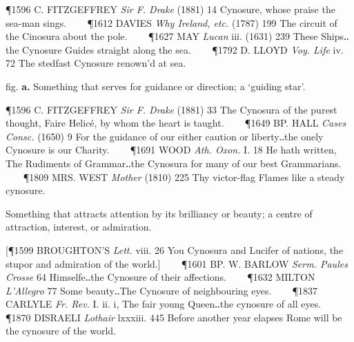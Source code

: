 \begin{description}[wide, labelwidth=!, labelindent=0pt]
\begin{myenumerate}
\P 1596 C. FITZGEFFREY  \textit{Sir F. Drake} (1881) 14 Cynosure, whose praise the sea-man sings.    
\P 1612 DAVIES  \textit{Why Ireland, etc.} (1787) 199 The circuit of the Cinosura about the pole.    
\P 1627 MAY  \textit{Lucan} iii. (1631) 239 These Ships‥the Cynosure Guides straight along the sea.    
\P 1792 D. LLOYD  \textit{Voy. Life} iv. 72 The stedfast Cynosure renown'd at sea.

 fig. \textbf{a.} Something that serves for guidance or direction; a ‘guiding star’.

\P 1596 C. FITZGEFFREY  \textit{Sir F. Drake} (1881) 33 The Cynosura of the purest thought, Faire Helicé, by whom the heart is taught.    
\P 1649 BP. HALL  \textit{Cases Consc.} (1650) 9 For the guidance of our either caution or liberty‥the onely Cynosure is our Charity.    
\P 1691 WOOD  \textit{Ath. Oxon.} I. 18 He hath written, The Rudiments of Grammar‥the Cynosura for many of our best Grammarians.    
\P 1809 MRS. WEST  \textit{Mother} (1810) 225 Thy victor-flag Flames like a steady cynosure.

 Something that attracts attention by its brilliancy or beauty; a centre of attraction, interest, or admiration.

[\P 1599 BROUGHTON'S  \textit{Lett.} viii. 26 You Cynosura and Lucifer of nations, the stupor and admiration of the world.]    
\P 1601 BP. W. BARLOW  \textit{Serm. Paules Crosse} 64 Himselfe‥the Cynosure of their affections.    
\P 1632 MILTON  \textit{L'Allegro} 77 Some beauty‥The Cynosure of neighbouring eyes.    
\P 1837 CARLYLE  \textit{Fr. Rev.} I. ii. i, The fair young Queen‥the cynosure of all eyes.    
\P 1870 DISRAELI  \textit{Lothair} lxxxiii. 445 Before another year elapses Rome will be the cynosure of the world.
\end{myenumerate}





\end{description}
